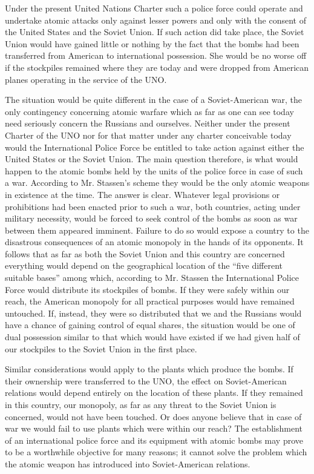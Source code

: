 Under the present United Nations Charter such a police force could operate and undertake atomic attacks only against lesser powers and only with the consent of the United States and the Soviet Union. If such action did take place, the Soviet Union would have gained little or nothing by the fact that the bombs had been transferred from American to international possession. She would be no worse off if the stockpiles remained where they are today and were dropped from American planes operating in the service of the UNO.

The situation would be quite different in the case of a Soviet-American war, the only contingency concerning atomic warfare which as far as one can see today need seriously concern the Russians and ourselves. Neither under the present Charter of the UNO nor for that matter under any charter conceivable today would the International Police Force be entitled to take action against either the United States or the Soviet Union. The main question therefore, is what would happen to the atomic bombs held by the units of the police force in case of such a war. According to Mr. Stassen's scheme they would be the only atomic weapons in existence at the time. The answer is clear. Whatever legal provisions or prohibitions had been enacted prior to such a war, both countries, acting under military necessity, would be forced to seek control of the bombs as soon as war between them appeared imminent. Failure to do so would expose a country to the disastrous consequences of an atomic monopoly in the hands of its opponents. It follows that as far as both the Soviet Union and this country are concerned everything would depend on the geographical location of the ``five different suitable bases'' among which, according to Mr. Stassen the International Police Force would distribute its stockpiles of bombs. If they were safely within our reach, the American monopoly for all practical purposes would have remained untouched. If, instead, they were so distributed that we and the Russians would have a chance of gaining control of equal shares, the situation would be one of dual possession similar to that which would have existed if we had given half of our stockpiles to the Soviet Union in the first place.

Similar considerations would apply to the plants which produce the bombs. If their ownership were transferred to the UNO, the effect on Soviet-American relations would depend entirely on the location of these plants. If they remained in this country, our monopoly, as far as any threat to the Soviet Union is concerned, would not have been touched. Or does anyone believe that in case of war we would fail to use plants which were within our reach? The establishment of an international police force and its equipment with atomic bombs may prove to be a worthwhile objective for many reasons; it cannot solve the problem which the atomic weapon has introduced into Soviet-American relations.

